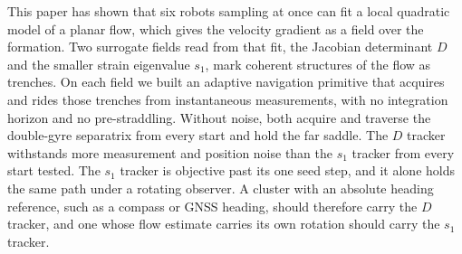 \documentclass[lettersize,journal]{IEEEtran}
\begin{document}
This paper has shown that six robots sampling at once can fit a local
quadratic model of a planar flow, which gives the velocity gradient as a
field over the formation. Two surrogate fields read from that fit, the
Jacobian determinant $D$ and the smaller strain eigenvalue $s_1$, mark
coherent structures of the flow as trenches. On each field we built an
adaptive navigation primitive that acquires and rides those trenches from
instantaneous measurements, with no integration horizon and no
pre-straddling. Without noise, both acquire and traverse the
double-gyre separatrix from every start and hold the far saddle. The $D$
tracker withstands more measurement and position noise than the $s_1$
tracker from every start tested. The $s_1$ tracker is objective past its
one seed step, and it alone holds the same path under a rotating observer.
A cluster with an absolute heading reference, such as a compass or GNSS
heading, should therefore carry the $D$ tracker, and one whose flow
estimate carries its own rotation should carry the $s_1$ tracker.
\end{document}
